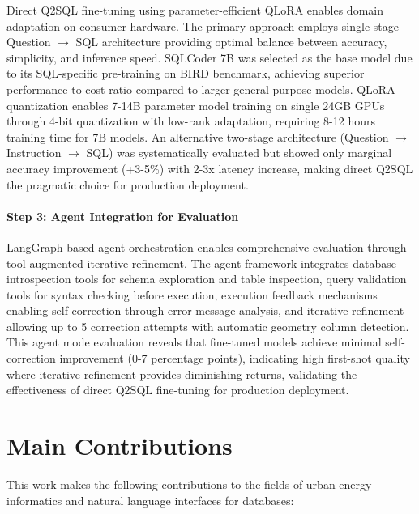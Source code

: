 Direct Q2SQL fine-tuning using parameter-efficient QLoRA enables domain adaptation on consumer hardware. The primary approach employs single-stage Question $\rightarrow$ SQL architecture providing optimal balance between accuracy, simplicity, and inference speed. SQLCoder 7B was selected as the base model due to its SQL-specific pre-training on BIRD benchmark, achieving superior performance-to-cost ratio compared to larger general-purpose models. QLoRA quantization enables 7-14B parameter model training on single 24GB GPUs through 4-bit quantization with low-rank adaptation, requiring 8-12 hours training time for 7B models. An alternative two-stage architecture (Question $\rightarrow$ Instruction $\rightarrow$ SQL) was systematically evaluated but showed only marginal accuracy improvement (+3-5\%) with 2-3x latency increase, making direct Q2SQL the pragmatic choice for production deployment.

\paragraph{Step 3: Agent Integration for Evaluation}

LangGraph-based agent orchestration enables comprehensive evaluation through tool-augmented iterative refinement. The agent framework integrates database introspection tools for schema exploration and table inspection, query validation tools for syntax checking before execution, execution feedback mechanisms enabling self-correction through error message analysis, and iterative refinement allowing up to 5 correction attempts with automatic geometry column detection. This agent mode evaluation reveals that fine-tuned models achieve minimal self-correction improvement (0-7 percentage points), indicating high first-shot quality where iterative refinement provides diminishing returns, validating the effectiveness of direct Q2SQL fine-tuning for production deployment.

\section{Main Contributions}

This work makes the following contributions to the fields of urban energy informatics and natural language interfaces for databases:

